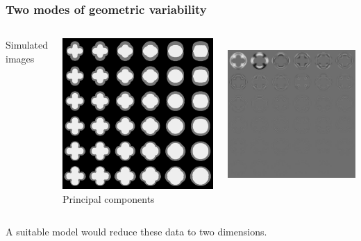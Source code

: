 \begin{frame}
\frametitle{Two modes of geometric variability}
\begin{columns}[c]
Simulated images\par
\includegraphics[height=0.9\textwidth]{things}
Principal components\par
\includegraphics[height=0.9\textwidth]{things_pca}
\end{columns}
A suitable model would reduce these data to two dimensions.
\end{frame}

